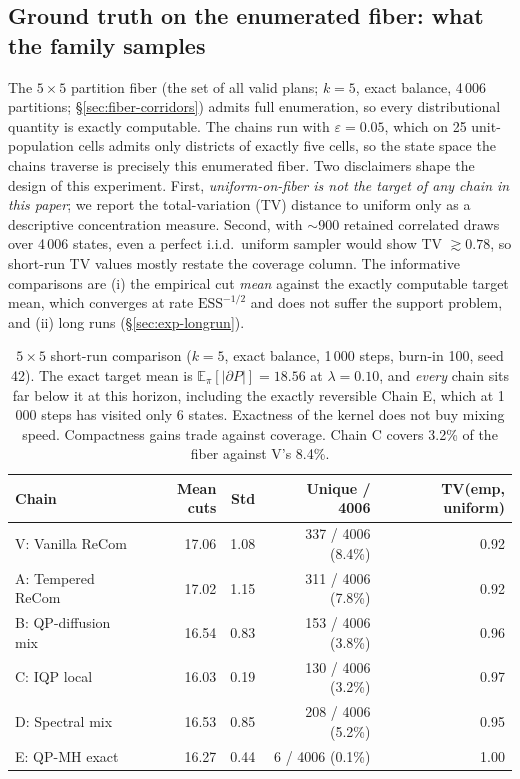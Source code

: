 \documentclass[11pt]{article}
\newcommand{\E}{\mathbb{E}}
\begin{document}
\subsection{Ground truth on the enumerated fiber: what the family samples}\label{sec:exp-5x5}

The $5 \times 5$ partition fiber (the set of all valid plans; $k = 5$, exact balance, 4\,006
partitions; \S\ref{sec:fiber-corridors}) admits full enumeration, so
every distributional quantity is exactly computable. The chains run
with $\varepsilon = 0.05$, which on 25 unit-population cells admits
only districts of exactly five cells, so the state space the chains
traverse is precisely this enumerated fiber. Two disclaimers
shape the design of this experiment. First, \emph{uniform-on-fiber is
not the target of any chain in this paper}; we report the total-variation
(TV) distance to uniform only as a descriptive concentration measure. Second, with $\sim$900
retained correlated draws over 4\,006 states, even a perfect
i.i.d.\ uniform sampler would show TV $\gtrsim 0.78$, so short-run TV
values mostly restate the coverage column. The informative
comparisons are (i) the empirical cut \emph{mean} against the exactly
computable target mean, which converges at rate
$\mathrm{ESS}^{-1/2}$ and does not suffer the support problem, and
(ii) long runs (\S\ref{sec:exp-longrun}).

\begin{table}[H]
\centering
\small
\begin{tabular}{lrrrr}
\toprule
Chain & Mean cuts & Std & Unique / 4006 & TV(emp, uniform) \\
\midrule
V: Vanilla ReCom     & 17.06 & 1.08 & 337 / 4006 (8.4\%) & 0.92 \\
A: Tempered ReCom    & 17.02 & 1.15 & 311 / 4006 (7.8\%) & 0.92 \\
B: QP-diffusion mix  & 16.54 & 0.83 & 153 / 4006 (3.8\%) & 0.96 \\
C: IQP local         & 16.03 & 0.19 & 130 / 4006 (3.2\%) & 0.97 \\
D: Spectral mix      & 16.53 & 0.85 & 208 / 4006 (5.2\%) & 0.95 \\
E: QP-MH exact       & 16.27 & 0.44 & \phantom{00}6 / 4006 (0.1\%) & 1.00 \\
\bottomrule
\end{tabular}
\caption{$5 \times 5$ short-run comparison ($k = 5$, exact balance,
  1\,000 steps, burn-in 100, seed 42). The exact target mean is
  $\E_\pi[|\partial P|] = 18.56$ at $\lambda = 0.10$, and \emph{every}
  chain sits far below it at this horizon, including the exactly
  reversible Chain E, which at 1\,000 steps has visited only 6 states. Exactness of the kernel does not buy mixing speed. Compactness
  gains trade against coverage. Chain C covers 3.2\% of the fiber against
  V's 8.4\%.}\label{tab:5x5-headline}
\end{table}
\end{document}
